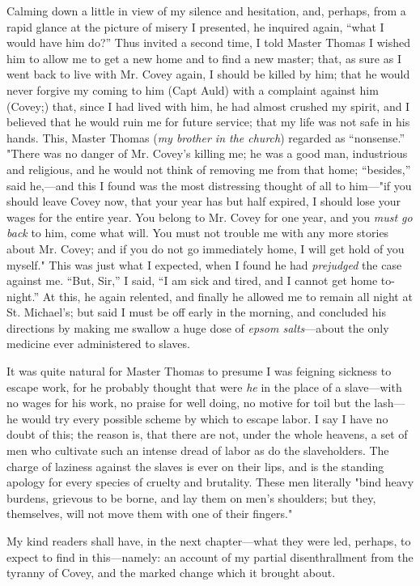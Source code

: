 Calming down a little in view of my silence and hesitation, and,
perhaps, from a rapid glance at the picture of misery I presented, he
inquired again, ``what I would have him do?'' Thus invited a second
time, I told Master Thomas I wished him to allow me to get a new home
and to find a new master; that, as sure as I went back to live with Mr.
Covey again, I should be killed by him; that he would never forgive my
coming to him (Capt Auld) with a complaint against him (Covey;) that,
since I had lived with him, he had almost crushed my spirit, and I
believed that he would ruin me for future service; that my life was not
safe in his hands. This, Master Thomas (\emph{my brother in the church})
regarded as ``nonsense.'' "There was no danger of Mr. Covey's killing
me; he was a good man, industrious and religious,
{\protect\hypertarget{231}{}{}}and he would not think of removing me
from that home; ``besides,'' said he,---and this I found was the most
distressing thought of all to him---"if you should leave Covey now, that
your year has but half expired, I should lose your wages for the entire
year. You belong to Mr. Covey for one year, and you \emph{must go back}
to him, come what will. You must not trouble me with any more stories
about Mr. Covey; and if you do not go immediately home, I will get hold
of you myself." This was just what I expected, when I found he had
\emph{prejudged} the case against me. ``But, Sir,'' I said, ``I am sick
and tired, and I cannot get home to-night.'' At this, he again relented,
and finally he allowed me to remain all night at St. Michael's; but said
I must be off early in the morning, and concluded his directions by
making me swallow a huge dose of \emph{epsom salts}---about the only
medicine ever administered to slaves.

It was quite natural for Master Thomas to presume I was feigning
sickness to escape work, for he probably thought that were \emph{he} in
the place of a slave---with no wages for his work, no praise for well
doing, no motive for toil but the lash---he would try every possible
scheme by which to escape labor. I say I have no doubt of this; the
reason is, that there are not, under the whole heavens, a set of men who
cultivate such an intense dread of labor as do the slaveholders. The
charge of laziness against the slaves is ever on their lips, and is the
standing apology for every species of cruelty and brutality. These men
literally "bind heavy burdens, grievous to be borne, and lay them
{\protect\hypertarget{232}{}{}}on men's shoulders; but they, themselves,
will not move them with one of their fingers."

My kind readers shall have, in the next chapter---what they were led,
perhaps, to expect to find in this---namely: an account of my partial
disenthrallment from the tyranny of Covey, and the marked change which
it brought about.
